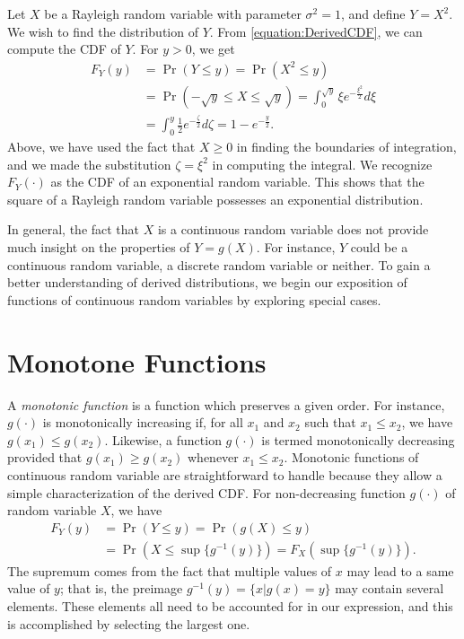 \begin{example}
Let $X$ be a Rayleigh  random variable with parameter $\sigma^2  = 1$, and define $Y = X^2$.
We wish to find the distribution of $Y$.
From \eqref{equation:DerivedCDF}, we can compute the CDF of $Y$.
For $y > 0$, we get
\begin{equation*}
\begin{split}
F_Y(y) &= \Pr (Y \leq y) = \Pr \left( X^2 \leq y \right) \\
&= \Pr (- \sqrt{y} \leq X \leq \sqrt{y})
= \int_0^{\sqrt{y}} \xi e^{- \frac{\xi^2}{2}} d\xi \\
&= \int_0^{y} \frac{1}{2} e^{- \frac{\zeta}{2}} d\zeta
= 1 - e^{-\frac{y}{2}} .
\end{split}
\end{equation*}
Above, we have used the fact that $X \geq 0$ in finding the boundaries of integration, and we made the substitution $\zeta = \xi^2$ in computing the integral.
We recognize $F_Y(\cdot)$ as the CDF of an exponential random variable.
This shows that the square of a Rayleigh random variable possesses an exponential distribution.
\end{example}

In general, the fact that $X$ is a continuous random variable does not provide much insight on the properties of $Y = g(X)$.
For instance, $Y$ could be a continuous random variable, a discrete random variable or neither.
To gain a better understanding of derived distributions, we begin our exposition of functions of continuous random variables by exploring special cases.


\section{Monotone Functions}

A \emph{monotonic function} is a function which preserves a given order.
For instance, $g(\cdot)$ is monotonically increasing if, for all $x_1$ and $x_2$ such that $x_1 \leq x_2$, we have $g(x_1) \leq g(x_2)$.
Likewise, a function $g(\cdot)$ is termed monotonically decreasing provided that $g(x_1) \geq g(x_2)$ whenever $x_1 \leq x_2$.
Monotonic functions of continuous random variable are straightforward to handle because they allow a simple characterization of the derived CDF.
For non-decreasing function $g(\cdot)$ of random variable $X$, we have
\begin{equation} \label{equation:MonotoneIncreasingCDF}
\begin{split}
F_Y(y) &= \Pr ( Y \leq y) = \Pr ( g(X) \leq y) \\
&= \Pr \left( X \leq \sup \{ g^{-1} (y) \} \right)
= F_X \left( \sup \{ g^{-1} (y) \} \right) .
\end{split}
\end{equation}
The supremum comes from the fact that multiple values of $x$ may lead to a same value of $y$; that is, the preimage $g^{-1}(y) = \{ x | g(x) = y \}$ may contain several elements.
These elements all need to be accounted for in our expression, and this is accomplished by selecting the largest one.

